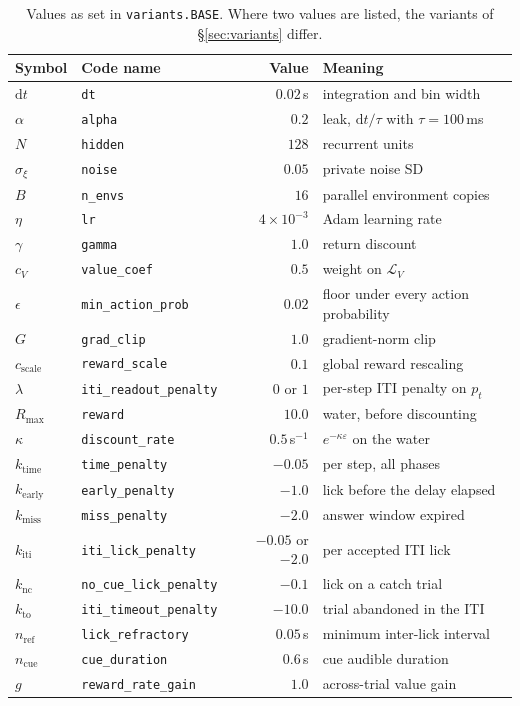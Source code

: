 \documentclass[11pt]{article}
\newcommand{\1}{\mathbf{1}}
\begin{document}
\begin{table}[h]\centering
\begin{tabular}{llrl}
\toprule
Symbol & Code name & Value & Meaning \\
\midrule
$\mathrm{d}t$ & \texttt{dt} & $0.02$\,s & integration and bin width \\
$\alpha$ & \texttt{alpha} & $0.2$ & leak, $\mathrm{d}t/\tau$ with $\tau = 100$\,ms \\
$N$ & \texttt{hidden} & $128$ & recurrent units \\
$\sigma_{\!\xi}$ & \texttt{noise} & $0.05$ & private noise SD \\
$B$ & \texttt{n\_envs} & $16$ & parallel environment copies \\
$\eta$ & \texttt{lr} & $4\times10^{-3}$ & Adam learning rate \\
$\gamma$ & \texttt{gamma} & $1.0$ & return discount \\
$c_V$ & \texttt{value\_coef} & $0.5$ & weight on $\mathcal{L}_V$ \\
$\epsilon$ & \texttt{min\_action\_prob} & $0.02$ & floor under every action probability \\
$G$ & \texttt{grad\_clip} & $1.0$ & gradient-norm clip \\
$c_{\mathrm{scale}}$ & \texttt{reward\_scale} & $0.1$ & global reward rescaling \\
$\lambda$ & \texttt{iti\_readout\_penalty} & $0$ or $1$ & per-step ITI penalty on $p_t$ \\
\midrule
$R_{\max}$ & \texttt{reward} & $10.0$ & water, before discounting \\
$\kappa$ & \texttt{discount\_rate} & $0.5$\,s$^{-1}$ & $e^{-\kappa\varepsilon}$ on the water \\
$k_{\mathrm{time}}$ & \texttt{time\_penalty} & $-0.05$ & per step, all phases \\
$k_{\mathrm{early}}$ & \texttt{early\_penalty} & $-1.0$ & lick before the delay elapsed \\
$k_{\mathrm{miss}}$ & \texttt{miss\_penalty} & $-2.0$ & answer window expired \\
$k_{\mathrm{iti}}$ & \texttt{iti\_lick\_penalty} & $-0.05$ or $-2.0$ & per accepted ITI lick \\
$k_{\mathrm{nc}}$ & \texttt{no\_cue\_lick\_penalty} & $-0.1$ & lick on a catch trial \\
$k_{\mathrm{to}}$ & \texttt{iti\_timeout\_penalty} & $-10.0$ & trial abandoned in the ITI \\
$n_{\mathrm{ref}}$ & \texttt{lick\_refractory} & $0.05$\,s & minimum inter-lick interval \\
$n_{\mathrm{cue}}$ & \texttt{cue\_duration} & $0.6$\,s & cue audible duration \\
$g$ & \texttt{reward\_rate\_gain} & $1.0$ & across-trial value gain \\
\bottomrule
\end{tabular}
\caption{Values as set in \texttt{variants.BASE}. Where two values are listed, the variants of
\S\ref{sec:variants} differ.}
\end{table}
\end{document}
